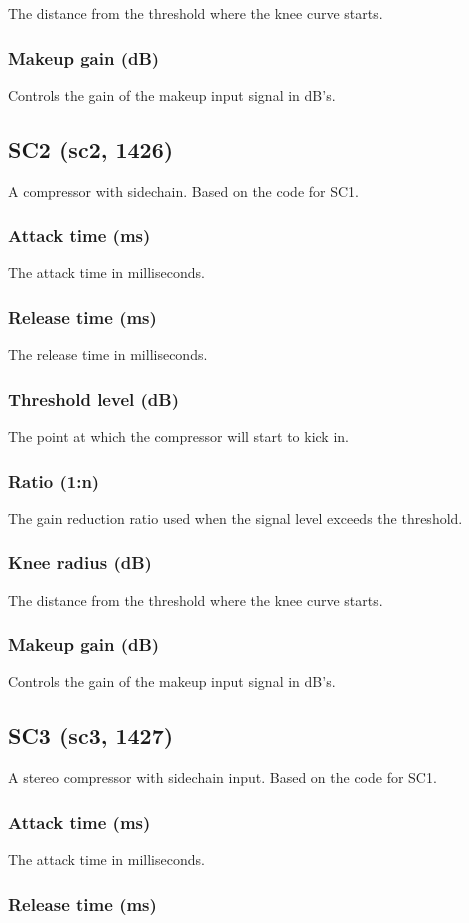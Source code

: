 \documentclass[11pt]{article}
\begin{document}
The distance from the threshold where the knee curve starts.\subsubsection*{Makeup gain (dB)}
Controls the gain of the makeup input signal in dB's.\subsection{SC2 (sc2, 1426)\label{sc2}\label{id1426}}
A compressor with sidechain. Based on the code for SC1.\subsubsection*{Attack time (ms)}
The attack time in milliseconds.\subsubsection*{Release time (ms)}
The release time in milliseconds.\subsubsection*{Threshold level (dB)}
The point at which the compressor will start to kick in.\subsubsection*{Ratio (1:n)}
The gain reduction ratio used when the signal level exceeds the threshold.\subsubsection*{Knee radius (dB)}
The distance from the threshold where the knee curve starts.\subsubsection*{Makeup gain (dB)}
Controls the gain of the makeup input signal in dB's.\subsection{SC3 (sc3, 1427)\label{sc3}\label{id1427}}
A stereo compressor with sidechain input. Based on the code for SC1.\subsubsection*{Attack time (ms)}
The attack time in milliseconds.\subsubsection*{Release time (ms)}
\end{document}
